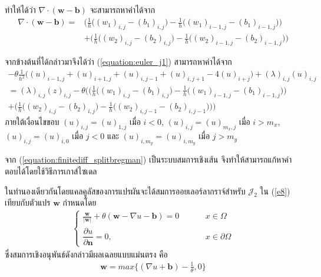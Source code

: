 ทำให้ได้ว่า $\nabla \cdot (\boldsymbol{w}-\boldsymbol{b})$ จะสามารถหาค่าได้จาก
\begin{align}
	\nonumber \nabla \cdot (\boldsymbol{w}-\boldsymbol{b}) = &\bigg( \frac{1}{h} \Big((w_1)_{i,j}-(b_1)_{i,j}\Big) - \frac{1}{h} \Big((w_1)_{i-1,j}-(b_1)_{i-1,j}\Big) \bigg) \\ 
	&+ \bigg( \frac{1}{h} \Big((w_2)_{i,j}-(b_2)_{i,j}\Big) - \frac{1}{h} \Big((w_2)_{i-1,j}-(b_2)_{i-1,j}\Big) \bigg)
\end{align}

จากข้างต้นที่ได้กล่าวมาจึงได้ว่า (\ref{equation:euler_j1})  สามารถหาค่าได้จาก 
\begin{align}
	\nonumber - \theta \frac{1}{h^2}\Big( (u)_{i-1,j} + (u)_{i+1,j} + (u)_{i,j-1} + (u)_{i,j+1} - 4(u)_{i+j} \Big) + (\lambda)_{i,j} (u)_{i,j} \\ \nonumber = (\lambda)_{i,j} (z)_{i,j} - \theta \Bigg( \bigg( \frac{1}{h} \Big((w_1)_{i,j}-(b_1)_{i,j}\Big) - \frac{1}{h} \Big((w_1)_{i-1,j}-(b_1)_{i-1,j}\Big) \bigg) \\ + \bigg( \frac{1}{h} \Big((w_2)_{i,j}-(b_2)_{i,j} \Big) - \frac{1}{h} \Big((w_2)_{i,j-1}-(b_2)_{i,j-1} \Big) \bigg) \Bigg)
	\label{equation:finitediff_splitbregman}
\end{align}
ภายใต้เงื่อนไขขอบ $(u)_{i,j} = (u)_{1,j}$ เมื่อ $i < 0$, $(u)_{i,j} = (u)_{m_x,j}$ เมื่อ $i > m_x$, $(u)_{i,j} = (u)_{i,0}$ เมื่อ $j < 0$ และ $(u)_{i,m_y} = (u)_{i,m_y}$ เมื่อ $j > m_y$ 

\hspace{1cm} จาก (\ref{equation:finitediff_splitbregman}) เป็นระบบสมการเชิงเส้น จึงทำให้สามารถแก้หาคำตอบได้โดยใช้วิธีการเกาส์ไซเดล


\hspace{1cm} ในทำนองเดียวกันโดยแคลคูลัสของการแปรผันจะได้สมการออยเลอร์ลากราจ์สำหรับ $\mathcal{J}_2$ ใน (\ref{e8}) เทียบกับตัวแปร $\boldsymbol{w}$ กำหนดโดย
\begin{align}
	\left \{ \begin{array}{ll} 	\frac{\boldsymbol{w}}{|\boldsymbol{w}|} + \theta(\boldsymbol{w}-\nabla u-\boldsymbol{b}) = 0   & \hspace{1cm} x \in \Omega \\
	\dfrac{\partial u}{\partial \boldsymbol{n}} = 0, & \hspace{1cm} x \in \partial \Omega \end{array} \right .
\end{align}
ซึ่งสมการเชิงอนุพันธ์ดังกล่าวมีผลเฉลยแบบแม่นตรง \cite{ref:splitbergman-inpaint} คือ 
\begin{align}
	\boldsymbol{w} = max\bigg\{(\nabla u + \boldsymbol{b}) - \frac{1}{\theta},0\bigg\}
	\label{equation:euler_w_exact}
\end{align}
